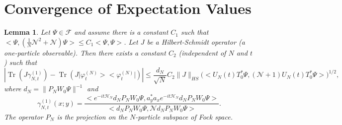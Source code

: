 \documentclass[11pt,a4paper,draft,DIV11]{scrartcl}	%
\newtheorem{lem}[thm]{Lemma}
\newcommand{\fock}{\mathcal{F}}		%
\newcommand{\Ncal}{\mathcal{N}}		%
\newcommand{\Hcal}{\mathcal{H}}		%
\newcommand{\scal}[2]{\big<#1,#2\big>} %
\newcommand{\norm}[1]{\lVert#1\rVert}	%
\newcommand{\ph}{\varphi_t^{(N)}}	%
\newcommand{\project}[1]{\lvert #1 \big>\big< #1\rvert}	%
\newcommand{\Tr}{\operatorname{Tr}}	%
\newcommand{\bd}{\begin{displaymath}}			%
\newcommand{\ed}{\end{displaymath}}
\begin{document}
\section{Convergence of Expectation Values}
\begin{lem}
\label{lem:TrJ}
Let $\Psi \in \fock$ and assume there is a constant $C_1$ such that $\scal{\Psi}{\left(\frac{1}{N}\Ncal^2 + \Ncal\right)\Psi} \leq C_1 \scal{\Psi}{\Psi}$. Let $J$ be a Hilbert-Schmidt operator (a one-particle observable). Then there exists a constant $C_2$ (independent of $N$ and $t$) such that
\bd
\left\lvert \Tr\left(J \gamma_{N,t}^{(1)} \right) - \Tr\left( J \project{\ph}  \right) \right\rvert \leq \frac{d_N}{\sqrt{N}}C_2 \norm{J}_{HS} \Big( \scal{U_N(t) T^\ast_0 \Psi}{\left( \Ncal+1 \right)U_N(t) T^\ast_0 \Psi} \Big)^{1/2},
\ed
where $d_N = \norm{P_N W_0\Psi}^{-1}$ and 
\bd
\gamma_{N,t}^{(1)}(x;y) = \frac{\scal{e^{-it \Hcal_N} d_N P_N W_0 \Psi}{a^\ast_y a_x e^{-it \Hcal_N} d_N P_N W_0 \Psi}}{\scal{d_N P_N W_0 \Psi}{\Ncal d_N P_N W_0 \Psi}}.
\ed
The operator $P_N$ is the projection on the $N$-particle subspace of Fock space.
%
\end{lem}
\end{document}
